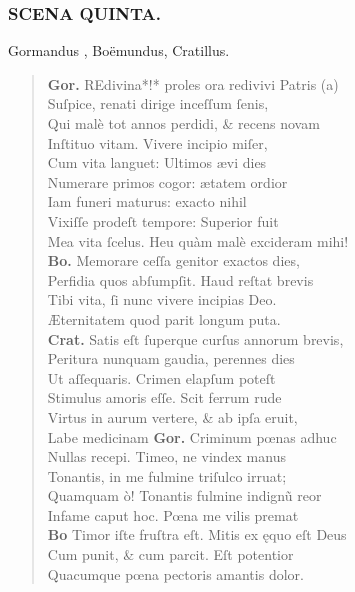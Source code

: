 \documentclass[a4paper,12pt]{article}
\begin{document}
\subsubsection{SCENA QUINTA.}
\label{sec:orge29a18d}
Gormandus , Boëmundus, Cratillus.
\begin{verse}
\textbf{Gor.} REdivina*!* proles ora redivivi Patris (a)\footnotemark\\[0pt]
Suſpice, renati dirige inceſſum ſenis,\\[0pt]
Qui malè tot annos perdidi, \& recens novam\\[0pt]
Inſtituo vitam. Vivere incipio miſer,\\[0pt]
Cum vita languet: Ultimos ævi dies\\[0pt]
Numerare primos cogor: ætatem ordior\\[0pt]
Iam funeri maturus: exacto nihil\\[0pt]
Vixiſſe prodeſt tempore: Superior fuit\\[0pt]
Mea vita ſcelus. Heu quàm malè excideram mihi!\\[0pt]
\textbf{Bo.} Memorare ceſſa genitor exactos dies,\\[0pt]
Perfidia quos abſumpſit. Haud reſtat brevis\\[0pt]
Tibi vita, ſi nunc vivere incipias Deo.\\[0pt]
Æternitatem quod parit longum puta.\\[0pt]
\textbf{Crat.} Satis eſt ſuperque curſus annorum brevis,\\[0pt]
Peritura nunquam gaudia, perennes dies\\[0pt]
Ut aſſequaris. Crimen elapſum poteſt\\[0pt]
Stimulus amoris eſſe. Scit ferrum rude\\[0pt]
Virtus in aurum vertere, \& ab ipſa eruit,\\[0pt]
Labe medicinam \textbf{Gor.} Criminum pœnas adhuc\\[0pt]
Nullas recepi. Timeo, ne vindex manus\\[0pt]
Tonantis, in me fulmine triſulco irruat;\\[0pt]
Quamquam ò! Tonantis fulmine indignũ reor\\[0pt]
Infame caput hoc. Pœna me vilis premat\\[0pt]
\textbf{Bo} Timor iſte fruſtra eſt. Mitis ex ęquo eſt Deus\\[0pt]
Cum punit, \& cum parcit. Eſt potentior\\[0pt]
Quacumque pœna pectoris amantis dolor.\\[0pt]

\end{verse}
\end{document}
